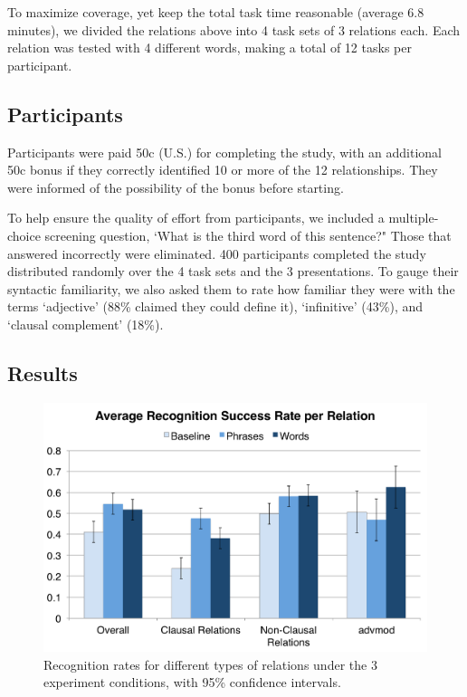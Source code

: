 To maximize coverage, yet keep the total task time reasonable (average 6.8 minutes), we divided the relations above into 4 task sets of 3 relations each. Each relation was tested with 4 different words, making a total of 12 tasks per participant.

\subsection{Participants}
Participants were paid 50c (U.S.) for completing the study, with an additional 50c bonus if they correctly identified 10 or more of the 12 relationships. They were informed of the possibility of the bonus before starting.

To help ensure the quality of effort from participants, we included a multiple-choice screening question, `What is the third word of this sentence?"  Those that answered incorrectly were eliminated. 400 participants completed the study distributed randomly over the 4 task sets and the 3 presentations. To gauge their syntactic familiarity, we also asked them to rate how familiar they were with the terms `adjective' (88\% claimed they could define it), `infinitive' (43\%), and `clausal complement' (18\%).

\subsection{Results}
\begin{figure}
\centering
\includegraphics[width=\columnwidth]{fig/results}
\caption{\label{fig:results} Recognition rates for different types of relations under the 3 experiment conditions, with 95\% confidence intervals.}
\end{figure}

